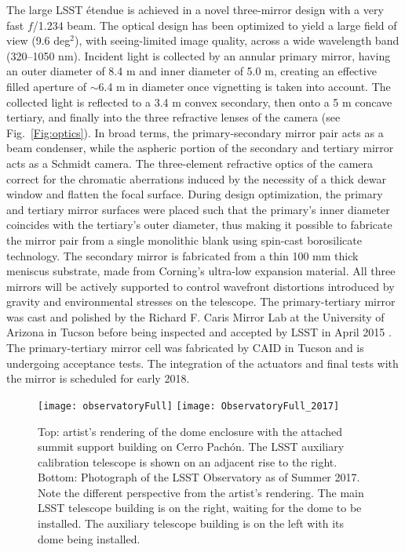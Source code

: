 The large LSST \'etendue is achieved in a novel three-mirror design
\citep[modified Paul-Baker Mersenne-Schmidt system;][]{2000ASPC..195...81A} with a very fast $f$/1.234 beam. The optical
design has been optimized to yield a large field of view (9.6 deg$^2$),
with seeing-limited image quality, across a wide wavelength band (320--1050
nm). Incident light is collected by an annular primary mirror, having
an outer diameter of 8.4 m and inner diameter of 5.0 m, creating an effective filled aperture of
$\sim$6.4 m in diameter once vignetting is taken into account. The
collected light is reflected to a 3.4 m convex secondary, then onto
a 5 m concave tertiary, and finally  into the three refractive lenses of the camera (see Fig.~\ref{Fig:optics}).
In broad terms, the primary-secondary mirror pair acts as a beam condenser, while the aspheric portion of
the secondary and tertiary mirror acts as a Schmidt camera.  The three-element refractive optics of the camera
correct for the chromatic aberrations induced by the necessity of a thick dewar window and flatten the
focal surface.  During design optimization, the primary and tertiary mirror surfaces were placed such that the primary's
inner diameter coincides with the tertiary's outer diameter, thus making it possible to fabricate the mirror pair from a
single monolithic blank using spin-cast borosilicate technology. The secondary mirror is fabricated from
a thin 100 mm thick meniscus substrate, made from Corning's ultra-low expansion material. All
three mirrors will be actively supported to control wavefront distortions
introduced by gravity and environmental stresses on the telescope.
The primary-tertiary mirror was cast and polished
by the Richard F. Caris Mirror Lab at the University of Arizona in Tucson
before being inspected and accepted by LSST in April 2015
\citep{2016SPIE.9906E..0LA}. The  primary-tertiary mirror cell was
fabricated by CAID in Tucson and is undergoing acceptance tests. The
integration of the actuators and final tests with the mirror is
scheduled for early 2018.

\begin{figure}
\texttt{[image: observatoryFull]}
\texttt{[image: ObservatoryFull\_2017]}
\caption{Top: artist's rendering of the dome enclosure
with the attached summit support building on Cerro Pach\'{o}n. The LSST auxiliary
calibration telescope is shown on an adjacent rise to the right.
Bottom: Photograph of the LSST Observatory as of Summer 2017. Note the
different perspective from the artist's rendering.  The main LSST
telescope building is on the right, waiting for the dome to be
installed. The auxiliary telescope building is on the left with its
dome being installed.}
\label{Fig:observatory}
\end{figure}

